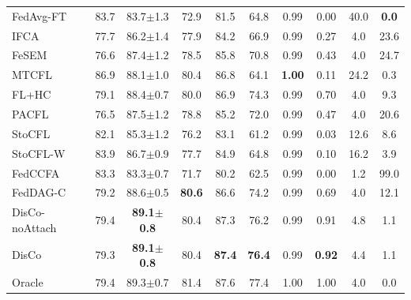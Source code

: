 \begin{tabular}{lccccccccc}
FedAvg-FT & 83.7 & 83.7$\pm$1.3 & 72.9 & 81.5 & 64.8 & 0.99 & 0.00 & 40.0 & \textbf{0.0} \\
IFCA & 77.7 & 86.2$\pm$1.4 & 77.9 & 84.2 & 66.9 & 0.99 & 0.27 & 4.0 & 23.6 \\
FeSEM & 76.6 & 87.4$\pm$1.2 & 78.5 & 85.8 & 70.8 & 0.99 & 0.43 & 4.0 & 24.7 \\
MTCFL & 86.9 & 88.1$\pm$1.0 & 80.4 & 86.8 & 64.1 & \textbf{1.00} & 0.11 & 24.2 & 0.3 \\
FL+HC & 79.1 & 88.4$\pm$0.7 & 80.0 & 86.9 & 74.3 & 0.99 & 0.70 & 4.0 & 9.3 \\
PACFL & 76.5 & 87.5$\pm$1.2 & 78.8 & 85.2 & 72.0 & 0.99 & 0.47 & 4.0 & 20.6 \\
StoCFL & 82.1 & 85.3$\pm$1.2 & 76.2 & 83.1 & 61.2 & 0.99 & 0.03 & 12.6 & 8.6 \\
StoCFL-W & 83.9 & 86.7$\pm$0.9 & 77.7 & 84.9 & 64.8 & 0.99 & 0.10 & 16.2 & 3.9 \\
FedCCFA & 83.3 & 83.3$\pm$0.7 & 71.7 & 80.2 & 62.5 & 0.99 & 0.00 & 1.2 & 99.0 \\
FedDAG-C & 79.2 & 88.6$\pm$0.5 & \textbf{80.6} & 86.6 & 74.2 & 0.99 & 0.69 & 4.0 & 12.1 \\
DisCo-noAttach & 79.4 & \textbf{89.1$\pm$0.8} & 80.4 & 87.3 & 76.2 & 0.99 & 0.91 & 4.8 & 1.1 \\
DisCo & 79.3 & \textbf{89.1$\pm$0.8} & 80.4 & \textbf{87.4} & \textbf{76.4} & 0.99 & \textbf{0.92} & 4.4 & 1.1 \\
Oracle & 79.4 & 89.3$\pm$0.7 & 81.4 & 87.6 & 77.4 & 1.00 & 1.00 & 4.0 & 0.0 \\
\bottomrule
\end{tabular}
